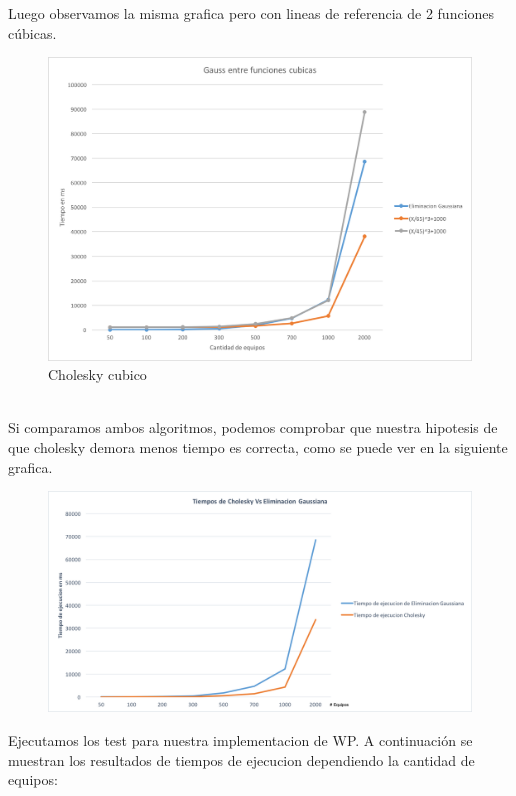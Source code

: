 Luego observamos la misma grafica pero con lineas de referencia de 2 funciones cúbicas.\\

\begin{figure}[H]
\centering
\includegraphics[width=1\textwidth]{IMG/gaussEntreCubicas.png}
\caption{Cholesky cubico}
\label{fig:Cholesky cubico}
\end{figure}

\\

Si comparamos ambos algoritmos, podemos comprobar que nuestra hipotesis de que cholesky demora menos tiempo es correcta, como se puede ver en la siguiente grafica.

\begin{figure}[H]
\centering
\includegraphics[width=1\textwidth]{IMG/tiemposgsvscholesky.png}
\end{figure}


Ejecutamos los test para nuestra implementacion de WP. A continuación se muestran los resultados de tiempos de ejecucion dependiendo la cantidad de equipos: \\


